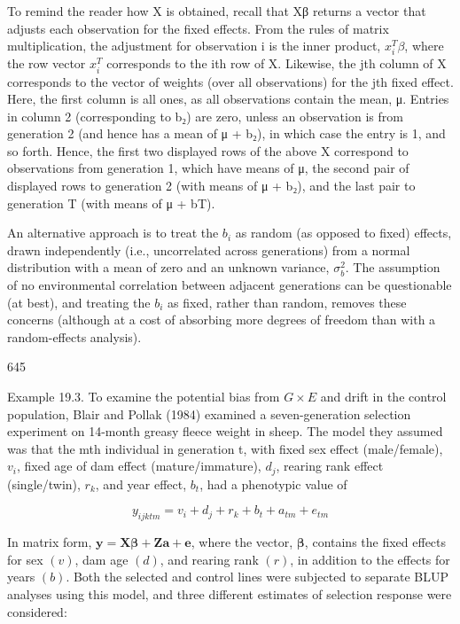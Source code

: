 \documentclass{article}
\begin{document}
To remind the reader how X is obtained, recall that Xβ returns a vector that adjusts each observation for the fixed effects. From the rules of matrix multiplication, the adjustment for observation i is the inner product,  $ x_i^T\beta $, where the row vector  $ x_i^T $ corresponds to the ith row of X. Likewise, the jth column of X corresponds to the vector of weights (over all observations) for the jth fixed effect. Here, the first column is all ones, as all observations contain the mean, μ. Entries in column 2 (corresponding to b₂) are zero, unless an observation is from generation 2 (and hence has a mean of μ + b₂), in which case the entry is 1, and so forth. Hence, the first two displayed rows of the above X correspond to observations from generation 1, which have means of μ, the second pair of displayed rows to generation 2 (with means of μ + b₂), and the last pair to generation T (with means of μ + bT).

An alternative approach is to treat the  $ b_i $ as random (as opposed to fixed) effects, drawn independently (i.e., uncorrelated across generations) from a normal distribution with a mean of zero and an unknown variance,  $ \sigma_b^2 $. The assumption of no environmental correlation between adjacent generations can be questionable (at best), and treating the  $ b_i $ as fixed, rather than random, removes these concerns (although at a cost of absorbing more degrees of freedom than with a random-effects analysis).

645

Example 19.3. To examine the potential bias from  $ G \times E $ and drift in the control population, Blair and Pollak (1984) examined a seven-generation selection experiment on 14-month greasy fleece weight in sheep. The model they assumed was that the mth individual in generation t, with fixed sex effect (male/female),  $ v_i $, fixed age of dam effect (mature/immature),  $ d_j $, rearing rank effect (single/twin),  $ r_k $, and year effect,  $ b_t $, had a phenotypic value of

\begin{equation}
y_{i j k t m}=v_{i}+d_{j}+r_{k}+b_{t}+a_{t m}+e_{t m}
\end{equation}

In matrix form,  $ \mathbf{y} = \mathbf{X} \boldsymbol{\beta} + \mathbf{Z} \mathbf{a} + \mathbf{e} $, where the vector,  $ \boldsymbol{\beta} $, contains the fixed effects for sex  $ (v) $, dam age  $ (d) $, and rearing rank  $ (r) $, in addition to the effects for years  $ (b) $. Both the selected and control lines were subjected to separate BLUP analyses using this model, and three different estimates of selection response were considered:
\end{document}
